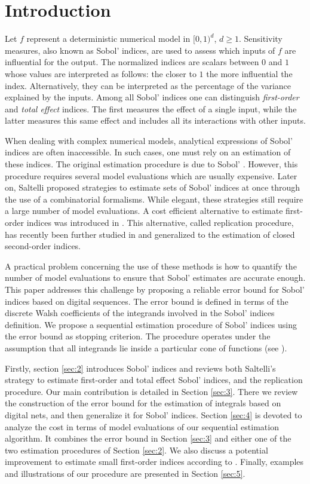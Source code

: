 \section{Introduction}
\label{sec:1}

Let $f$ represent a deterministic numerical model in $[0,1)^d$, $d \geq 1$. Sensitivity measures, also known as Sobol' indices, are used to assess which inputs of $f$ are influential for the output. The normalized indices are scalars between $0$ and $1$ whose values are interpreted as follows: the closer to $1$ the more influential the index. Alternatively, they can be interpreted as the percentage of the variance explained by the inputs. Among all Sobol' indices one can distinguish \emph{first-order} and \emph{total effect} indices. The first measures the effect of a single input, while the latter measures this same effect and includes all its interactions with other inputs.

When dealing with complex numerical models, analytical expressions of Sobol' indices are often inaccessible. In such cases, one must rely on an estimation of these indices. The original estimation procedure is due to Sobol' \cite{Sobol'}. However, this procedure requires several model evaluations which are usually expensive. Later on, Saltelli \cite{Saltelli} proposed strategies to estimate sets of Sobol' indices at once through the use of a combinatorial formalisms. While elegant, these strategies still require a large number of model evaluations.  A cost efficient alternative to estimate first-order indices was introduced in \cite{Mara}. This alternative, called replication procedure, has recently been further studied  in \cite{Tissot} and generalized to the estimation of closed second-order indices.

A practical problem concerning the use of these methods is how to quantify the number of model evaluations to ensure that Sobol' estimates are accurate enough. This paper addresses this challenge by proposing a reliable error bound for Sobol' indices based on digital sequences. The error bound is defined in terms of the discrete Walsh coefficients of the integrands involved in the Sobol' indices definition. We propose a sequential estimation procedure of Sobol' indices using the error bound as stopping criterion. The procedure operates under the assumption that all integrands lie inside a particular cone of functions (see \cite{HicJim}).

Firstly, section \ref{sec:2} introduces Sobol' indices and reviews both Saltelli's strategy to estimate first-order and total effect Sobol' indices, and the replication procedure. Our main contribution is detailed in  Section \ref{sec:3}. There we review the construction of the error bound for the estimation of integrals based on digital nets, and then generalize it for Sobol' indices. Section \ref{sec:4} is devoted to analyze the cost in terms of model evaluations of our sequential estimation algorithm. It combines the error bound in Section \ref{sec:3} and either one of the two estimation procedures of Section \ref{sec:2}. We also discuss a potential improvement to estimate small first-order indices according to \cite{Owen}. Finally, examples and illustrations of our procedure are presented in Section \ref{sec:5}. 


